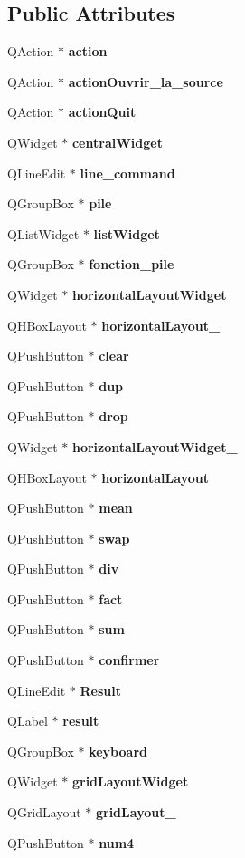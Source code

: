 \subsection*{Public Attributes}
\begin{DoxyCompactItemize}
\item 
Q\-Action $\ast$ {\bf action}
\item 
Q\-Action $\ast$ {\bf action\-Ouvrir\-\_\-la\-\_\-source}
\item 
Q\-Action $\ast$ {\bf action\-Quit}
\item 
Q\-Widget $\ast$ {\bf central\-Widget}
\item 
Q\-Line\-Edit $\ast$ {\bf line\-\_\-command}
\item 
Q\-Group\-Box $\ast$ {\bf pile}
\item 
Q\-List\-Widget $\ast$ {\bf list\-Widget}
\item 
Q\-Group\-Box $\ast$ {\bf fonction\-\_\-pile}
\item 
Q\-Widget $\ast$ {\bf horizontal\-Layout\-Widget}
\item 
Q\-H\-Box\-Layout $\ast$ {\bf horizontal\-Layout\-\_}
\item 
Q\-Push\-Button $\ast$ {\bf clear}
\item 
Q\-Push\-Button $\ast$ {\bf dup}
\item 
Q\-Push\-Button $\ast$ {\bf drop}
\item 
Q\-Widget $\ast$ {\bf horizontal\-Layout\-Widget\-\_}
\item 
Q\-H\-Box\-Layout $\ast$ {\bf horizontal\-Layout}
\item 
Q\-Push\-Button $\ast$ {\bf mean}
\item 
Q\-Push\-Button $\ast$ {\bf swap}
\item 
Q\-Push\-Button $\ast$ {\bf div}
\item 
Q\-Push\-Button $\ast$ {\bf fact}
\item 
Q\-Push\-Button $\ast$ {\bf sum}
\item 
Q\-Push\-Button $\ast$ {\bf confirmer}
\item 
Q\-Line\-Edit $\ast$ {\bf Result}
\item 
Q\-Label $\ast$ {\bf result}
\item 
Q\-Group\-Box $\ast$ {\bf keyboard}
\item 
Q\-Widget $\ast$ {\bf grid\-Layout\-Widget}
\item 
Q\-Grid\-Layout $\ast$ {\bf grid\-Layout\-\_}
\item 
Q\-Push\-Button $\ast$ {\bf num4}

\end{DoxyCompactItemize}
